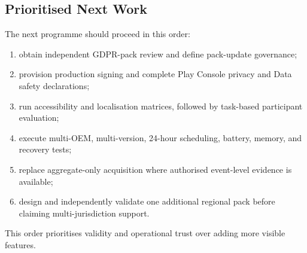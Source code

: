 \subsection{Prioritised Next Work}

The next programme should proceed in this order:

\begin{enumerate}
    \item obtain independent GDPR-pack review and define pack-update governance;
    \item provision production signing and complete Play Console privacy and Data safety declarations;
    \item run accessibility and localisation matrices, followed by task-based participant evaluation;
    \item execute multi-OEM, multi-version, 24-hour scheduling, battery, memory, and recovery tests;
    \item replace aggregate-only acquisition where authorised event-level evidence is available;
    \item design and independently validate one additional regional pack before claiming multi-jurisdiction support.
\end{enumerate}

This order prioritises validity and operational trust over adding more visible features.
